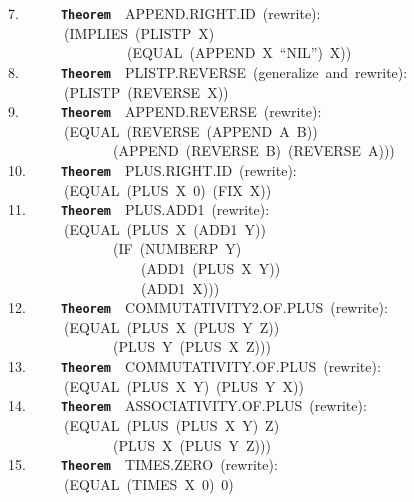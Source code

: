 \documentclass[11pt]{book}
\newenvironment{pubasis}{\begin{flushleft}\ttfamily\small}{\normalsize\rmfamily\end{flushleft}}
\newcommand{\axiomordefinition}[1]{\vspace{6pt}\texttt{\textbf{#1}}}
\begin{document}
\begin{pubasis}
7.~~~~~~\axiomordefinition{Theorem}~~APPEND.RIGHT.ID~(rewrite):\\
~~~~~~~~(IMPLIES~(PLISTP~X)\\
~~~~~~~~~~~~~~~~~(EQUAL~(APPEND~X~``NIL'')~X))\\

8.~~~~~~\axiomordefinition{Theorem}~~PLISTP.REVERSE~(generalize~and~rewrite):\\
~~~~~~~~(PLISTP~(REVERSE~X))\\

9.~~~~~~\axiomordefinition{Theorem}~~APPEND.REVERSE~(rewrite):\\
~~~~~~~~(EQUAL~(REVERSE~(APPEND~A~B))\\
~~~~~~~~~~~~~~~(APPEND~(REVERSE~B)~(REVERSE~A)))\\

10.~~~~~\axiomordefinition{Theorem}~~PLUS.RIGHT.ID~(rewrite):\\
~~~~~~~~(EQUAL~(PLUS~X~0)~(FIX~X))\\

11.~~~~~\axiomordefinition{Theorem}~~PLUS.ADD1~(rewrite):\\
~~~~~~~~(EQUAL~(PLUS~X~(ADD1~Y))\\
~~~~~~~~~~~~~~~(IF~(NUMBERP~Y)\\
~~~~~~~~~~~~~~~~~~~(ADD1~(PLUS~X~Y))\\
~~~~~~~~~~~~~~~~~~~(ADD1~X)))\\

12.~~~~~\axiomordefinition{Theorem}~~COM\-MU\-TA\-TIV\-ITY2.OF.PLUS~(rewrite):\\
~~~~~~~~(EQUAL~(PLUS~X~(PLUS~Y~Z))\\
~~~~~~~~~~~~~~~(PLUS~Y~(PLUS~X~Z)))\\

13.~~~~~\axiomordefinition{Theorem}~~COM\-MU\-TA\-TIV\-ITY.OF.PLUS~(rewrite):\\
~~~~~~~~(EQUAL~(PLUS~X~Y)~(PLUS~Y~X))\\

14.~~~~~\axiomordefinition{Theorem}~~ASSOC\-IATIV\-ITY.OF.PLUS~(rewrite):\\
~~~~~~~~(EQUAL~(PLUS~(PLUS~X~Y)~Z)\\
~~~~~~~~~~~~~~~(PLUS~X~(PLUS~Y~Z)))\\

15.~~~~~\axiomordefinition{Theorem}~~TIMES.ZERO~(rewrite):\\
~~~~~~~~(EQUAL~(TIMES~X~0)~0)\\


\end{pubasis}
\end{document}
